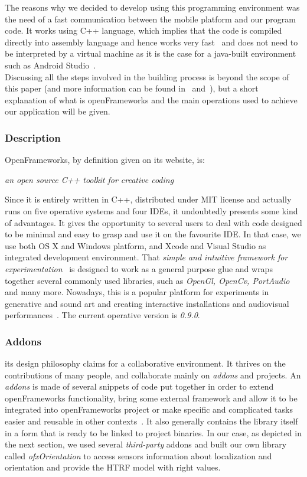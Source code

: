 \documentclass[journal]{IEEEtran}
\begin{document}
The reasons why we decided to develop using this programming environment was the need of a fast communication between the mobile platform and our program code. It works using C++ language, which implies that the code is compiled directly into assembly language and hence works very fast~\cite{} and does not need to be interpreted by a virtual machine as it is the case for a java-built environment such as Android Studio~\cite{}. \\
Discussing all the steps involved in the building process is beyond the scope of this paper (and more information can be found in~\cite{} and~\cite{}), but a short explanation of what is openFrameworks and the main operations used to achieve our application will be given. \\
\subsubsection{Description}
OpenFrameworks, by definition given on its website, is:
\begin{center}
{\footnotesize{\textit{an open source C++ toolkit for creative coding}}~\cite{}}
\end{center}
Since it is entirely written in C++, distributed under MIT license and actually runs on five operative systems and four IDEs, it undoubtedly presents some kind of advantages. It gives the opportunity to several users to deal with code designed to be minimal and easy to grasp and use it on the favourite IDE. In that case, we use both OS X and Windows platform, and Xcode and Visual Studio as integrated development environment. That \textit{simple and intuitive framework for experimentation}~\cite{} is designed to work as a general purpose glue and wraps together several commonly used libraries, such as \emph{OpenGl, OpenCv, PortAudio} and many more. Nowadays, this is a popular platform for experiments in generative and sound art and creating interactive installations and audiovisual performances~\cite{}. The current operative version is \emph{0.9.0}.

\subsubsection{Addons}
its design philosophy claims for a collaborative environment. It thrives on the contributions of many people, and collaborate mainly on \emph{addons} and projects. An \emph{addons} is made of several snippets of code put together in order to extend openFrameworks functionality, bring some external framework and allow it to be integrated into openFrameworks project or make specific and complicated tasks easier and reusable in other contexts~\cite{}. It also generally contains the library itself in a form that is ready to be linked to project binaries. In our case, as depicted in the next section, we used several \textit{third-party} addons and built our own library called \emph{ofxOrientation} to access sensors information about localization and orientation and provide the HTRF model with right values. 
\end{document}
